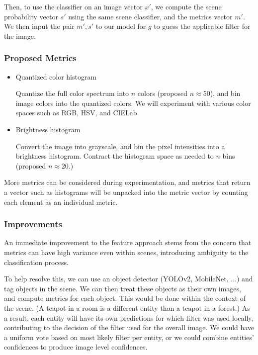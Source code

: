 \documentclass[a4paper, 11pt]{article}
\begin{document}
Then, to use the classifier on an image vector $x'$, we compute the scene probability vector $s'$ using the same scene classifier, and the metrics vector $m'$. We then input the pair $m', s'$ to our model for $g$ to guess the applicable filter for the image.

\subsubsection*{Proposed Metrics}

\begin{itemize}
    \item Quantized color histogram
    
    Quantize the full color spectrum into $n$ colors (proposed $n \approx 50$), and bin image colors into the quantized colors. We will experiment with various color spaces such as RGB, HSV, and CIELab
    
    \item Brightness histogram
    
    Convert the image into grayscale, and bin the pixel intensities into a brightness histogram. Contract the histogram space as needed to $n$ bins (proposed $n \approx 20$.)
\end{itemize}

More metrics can be considered during experimentation, and metrics that return a vector such as histograms will be unpacked into the metric vector by counting each element as an individual metric.


\subsubsection*{Improvements}
An immediate improvement to the feature approach stems from the concern that metrics can have high variance even within scenes, introducing ambiguity to the classification process. 

To help resolve this, we can use an object detector (YOLOv2, MobileNet, ...) and tag objects in the scene. We can then treat these objects as their own images, and compute metrics for each object. This would be done within the context of the scene. (A teapot in a room is a different entity than a teapot in a forest.) As a result, each entity will have its own predictions for which filter was used locally, contributing to the decision of the filter used for the overall image. We could have a uniform vote based on most likely filter per entity, or we could combine entities' confidences to produce image level confidences.
\end{document}
